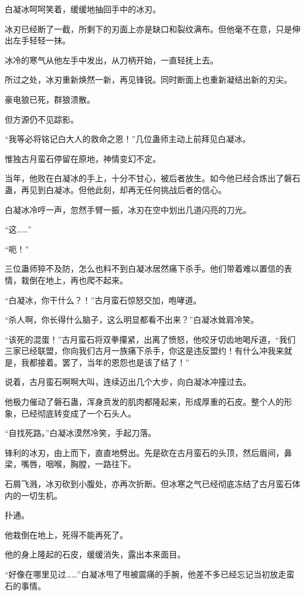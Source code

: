 \begin{this_body}
白凝冰呵呵笑着，缓缓地抽回手中的冰刃。

冰刃已经断了一截，所剩下的刃面上亦是缺口和裂纹满布。但他毫不在意，只是伸出左手轻轻一抹。

冰冷的寒气从他左手中发出，从刀柄开始，一直轻抚上去。

所过之处，冰刃重新焕然一新，再见锋锐。同时断面上也重新凝结出新的刃尖。

豪电狼已死，群狼溃散。

但方源仍不见踪影。

“我等必将铭记白大人的救命之恩！”几位蛊师主动上前拜见白凝冰。

惟独古月蛮石停留在原地，神情变幻不定。

当年，他败在白凝冰的手上，十分不甘心，被后者放生。如今他已经合炼出了磐石蛊，再见到白凝冰。但他此刻，却再无任何挑战后者的信心。

白凝冰冷哼一声，忽然手臂一振，冰刃在空中划出几道闪亮的刀光。

“这……”

“呃！”

三位蛊师猝不及防，怎么也料不到白凝冰居然痛下杀手。他们带着难以置信的表情，栽倒在地上，再也爬不起来。

“白凝冰，你干什么？！”古月蛮石惊怒交加，咆哮道。

“杀人啊，你长得什么脑子，这么明显都看不出来？”白凝冰耸肩冷笑。

“该死的混蛋！”古月蛮石将双拳攥紧，出离了愤怒，他咬牙切齿地喝斥道，“我们三家已经联盟，你向我们古月一族痛下杀手，你这是违反盟约！有什么冲我来就是，我都接着。罢了，当年的恩怨也是该了结了！”

说着，古月蛮石啊啊大叫，连续迈出几个大步，向白凝冰冲撞过去。

他极力催动了磐石蛊，浑身贲发的肌肉都隆起来，形成厚重的石皮。整个人的形象，已经彻底转变成了一个石头人。

“自找死路。”白凝冰漠然冷笑，手起刀落。

锋利的冰刃，由上而下，直直地劈出。先是砍在古月蛮石的头顶，然后眉间，鼻梁，嘴唇，咽喉，胸膛，一路往下。

石屑飞溅，冰刃砍到小腹处，亦再次折断。但冰寒之气已经彻底冻结了古月蛮石体内的一切生机。

扑通。

他栽倒在地上，死得不能再死了。

他的身上隆起的石皮，缓缓消失，露出本来面目。

“好像在哪里见过……”白凝冰甩了甩被震痛的手腕，他差不多已经忘记当初放走蛮石的事情。


\end{this_body}

